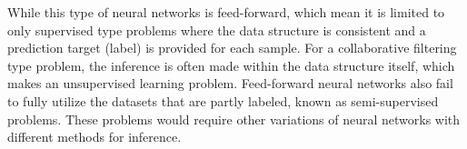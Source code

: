 While this type of neural networks is feed-forward, 
which mean it is limited to only supervised type problems
where the data structure is consistent 
and a prediction target (label) is provided for each sample.
For a collaborative filtering type problem,
the inference is often made within the data structure itself, 
which makes an unsupervised learning problem.
Feed-forward neural networks also fail to fully utilize 
the datasets that are partly labeled, 
known as semi-supervised problems.
These problems would require other variations of neural networks
with different methods for inference.






